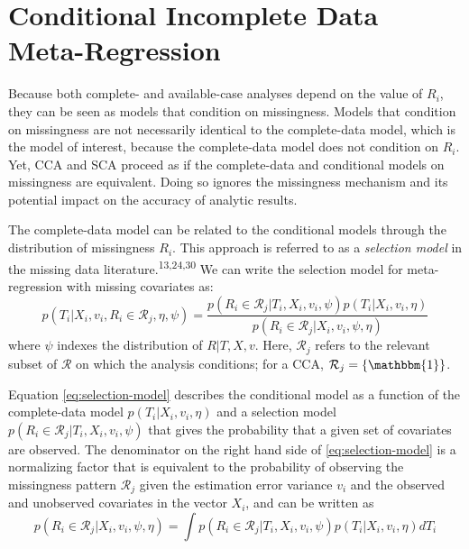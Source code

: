 \documentclass[
]{article}
\begin{document}
\hypertarget{conditional-incomplete-data-meta-regression}{%
\section{Conditional Incomplete Data Meta-Regression}\label{conditional-incomplete-data-meta-regression}}

Because both complete- and available-case analyses depend on the value of \(R_i\), they can be seen as models that condition on missingness.
Models that condition on missingness are not necessarily identical to the complete-data model, which is the model of interest, because the complete-data model does not condition on \(R_i\).
Yet, CCA and SCA proceed as if the complete-data and conditional models on missingness are equivalent.
Doing so ignores the missingness mechanism and its potential impact on the accuracy of analytic results.

The complete-data model can be related to the conditional models through the distribution of missingness \(R_i\).
This approach is referred to as a \emph{selection model} in the missing data literature.\textsuperscript{13,24,30}
We can write the selection model for meta-regression with missing covariates as:
\begin{equation}
p(T_i | X_i, v_i, R_i \in \mathcal{R}_j, \eta, \psi) 
  = \frac{p(R_i \in \mathcal{R}_j | T_i, X_i, v_i, \psi)p(T_i | X_i, v_i, \eta)}{p(R_i \in \mathcal{R}_j | X_i, v_i, \psi, \eta)} 
\label{eq:selection-model}
\end{equation}
where \(\psi\) indexes the distribution of \(R | T, X, v\).
Here, \(\mathcal{R}_j\) refers to the relevant subset of \(\mathcal{R}\) on which the analysis conditions; for a CCA, \(\mathcal{R}_j = \{\mathbbm{1}\}\).

Equation \eqref{eq:selection-model} describes the conditional model as a function of the complete-data model \(p(T_i | X_i, v_i, \eta)\) and a selection model \(p(R_i \in \mathcal{R}_j | T_i, X_i, v_i, \psi)\) that gives the probability that a given set of covariates are observed.
The denominator on the right hand side of \eqref{eq:selection-model} is a normalizing factor that is equivalent to the probability of observing the missingness pattern \(\mathcal{R}_j\) given the estimation error variance \(v_i\) and the observed and unobserved covariates in the vector \(X_i\), and can be written as
\begin{equation}
p(R_i \in \mathcal{R}_j | X_i, v_i, \psi, \eta) = \int p(R_i \in \mathcal{R}_j | T_i, X_i, v_i, \psi)p(T_i | X_i, v_i, \eta) dT_i
\label{eq:pr-xv}
\end{equation}
\end{document}

